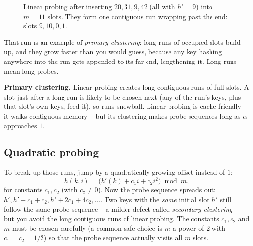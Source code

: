 \begin{figure}[h]
\centering
{}
\caption{Linear probing after inserting $20,31,9,42$ (all with $h'=9$) into $m=11$ slots. They form one contiguous run wrapping past the end: slots $9,10,0,1$.}
\label{ch11:linear-probing-picture}
\end{figure}

That run is an example of \emph{primary clustering}: long runs of occupied slots build up, and they grow faster than you would guess, because any key hashing anywhere into the run gets appended to its far end, lengthening it. Long runs mean long probes.

\begin{trapbox}
\textbf{Primary clustering.} Linear probing creates long contiguous runs of full slots. A slot just after a long run is likely to be chosen next (any of the run's keys, plus that slot's own keys, feed it), so runs snowball. Linear probing is cache-friendly -- it walks contiguous memory -- but its clustering makes probe sequences long as $\alpha$ approaches $1$.
\end{trapbox}

\subsection{Quadratic probing}

To break up those runs, jump by a quadratically growing offset instead of $1$:
\[
  h(k,i) = \big(h'(k) + c_1 i + c_2 i^2\big) \bmod m,
\]
for constants $c_1, c_2$ (with $c_2 \neq 0$). Now the probe sequence spreads out: $h', h'+c_1+c_2, h'+2c_1+4c_2, \dots$. Two keys with the \emph{same} initial slot $h'$ still follow the same probe sequence -- a milder defect called \emph{secondary clustering} -- but you avoid the long contiguous runs of linear probing. The constants $c_1, c_2$ and $m$ must be chosen carefully (a common safe choice is $m$ a power of $2$ with $c_1 = c_2 = 1/2$) so that the probe sequence actually visits all $m$ slots.

